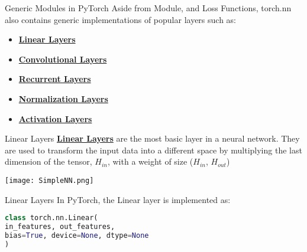 \documentclass{beamer}
\begin{document}
\begin{frame}[fragile]{Generic Modules in PyTorch}
    Aside from {Module}, and {Loss Functions}, {torch.nn} also contains generic implementations of popular layers such as:
    \begin{itemize}
        \item \href{https://pytorch.org/docs/stable/nn.html#linear-layers}{\textbf{Linear Layers}}
        \item \href{https://pytorch.org/docs/stable/nn.html#convolution-layers}{\textbf{Convolutional Layers}}
        \item \href{https://pytorch.org/docs/stable/nn.html#recurrent-layers}{\textbf{Recurrent Layers}}
        \item \href{https://pytorch.org/docs/stable/nn.html#normalization-layers}{\textbf{Normalization Layers}}
        \item \href{https://pytorch.org/docs/stable/nn.html#non-linear-activations-weighted-sum-nonlinearity}{\textbf{Activation Layers}}
    \end{itemize}
\end{frame}

\begin{frame}[fragile]{Linear Layers}
    \href{https://pytorch.org/docs/stable/nn.html#linear-layers}{\textbf{Linear Layers}} are the most basic layer in a neural network. They are used to transform the input data into a different space by multiplying the last dimension of the tensor, $H_{in}$, with a weight of size ($H_{in}$, $H_{out}$)
    \begin{center}
        \texttt{[image: SimpleNN.png]}
    \end{center}
\end{frame}
\begin{frame}[fragile]{Linear Layers}
    In PyTorch, the {Linear} layer is implemented as:
    \begin{exampleblock}{}
        \begin{lstlisting}[language=Python]
class torch.nn.Linear(
in_features, out_features,
bias=True, device=None, dtype=None
)
        \end{lstlisting}
    \end{exampleblock}
\end{frame}
\end{document}

